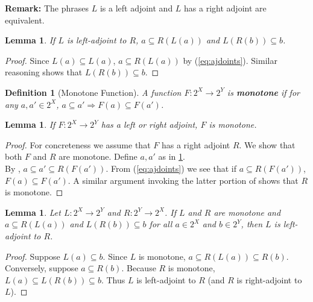 \documentclass{article}
\newtheorem{lemma}[proposition]{Lemma}
\newtheorem{definition}[proposition]{Definition}
\begin{document}
\textbf{Remark:} The phrases $L$ is a left adjoint and $L$ has a right adjoint are equivalent. 

\begin{lemma}\label{lem:inv-img-adjoint-lem-1}
If $L$ is left-adjoint to $R$, $a \subseteq R(L(a))$ and $L(R(b)) \subseteq b$.
\end{lemma}

\begin{proof}
Since $L(a) \subseteq L(a)$, $a \subseteq R(L(a))$ by (\ref{eq:ajdoints}). Similar reasoning shows that $L(R(b)) \subseteq b$.
\end{proof}

\begin{definition}[Monotone Function]\label{def:monotone-function}
A function $F : 2^X \to 2^Y$ is \textbf{monotone} if for any $a, a' \in 2^X$, $a \subseteq a' \Rightarrow F(a) \subseteq F(a')$.
\end{definition}

\begin{lemma}\label{lem:inv-image-adjoints-monotone}
If $F : 2^X \to 2^Y$ has a left or right adjoint, $F$ is monotone.
\end{lemma}

\begin{proof}
For concreteness we assume that $F$ has a right adjoint $R$. We show that both $F$ and $R$ are monotone. Define $a, a'$ as in \cref{def:monotone-function}.\\

By , $a \subseteq a' \subseteq R(F(a'))$. From (\ref{eq:ajdoints}) we see that if $a \subseteq R(F(a'))$, $F(a) \subseteq F(a')$. A similar argument invoking the latter portion of  shows that $R$ is monotone.
\end{proof}

\begin{lemma}
Let $L : 2^X \to 2^Y$ and $R : 2^Y \to 2^X$. If $L$ and $R$ are monotone and $a \subseteq R(L(a))$ and $L(R(b)) \subseteq b$ for all $a \in 2^X$ and $b \in 2^Y$, then $L$ is left-adjoint to $R$.
\end{lemma}

\begin{proof}
Suppose $L(a) \subseteq b$. Since $L$ is monotone, $a \subseteq R(L(a)) \subseteq R(b)$. Conversely, suppose $a \subseteq R(b)$. Because $R$ is monotone, $L(a) \subseteq L(R(b)) \subseteq b$. Thus $L$ is left-adjoint to $R$ (and $R$ is right-adjoint to $L$).
\end{proof}
\end{document}

